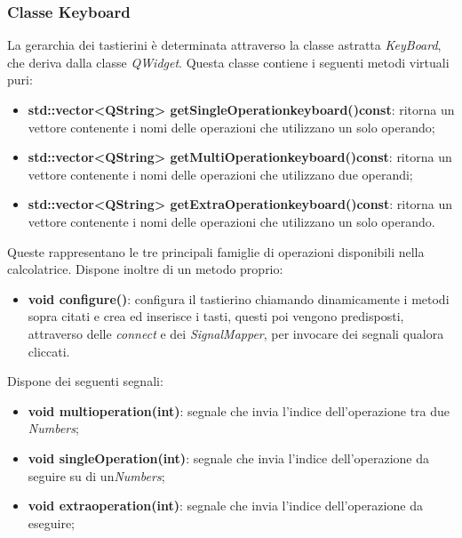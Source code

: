 \documentclass[a4paper,10pt]{article}
\begin{document}
        \subsubsection{Classe Keyboard}
        La gerarchia dei tastierini è determinata attraverso la classe astratta \textit{KeyBoard}, che deriva dalla classe \textit{QWidget}.
        Questa classe contiene i seguenti metodi virtuali puri:
        \begin{itemize}
            \item \textbf{std::vector<QString> getSingleOperationkeyboard()const}: ritorna un vettore contenente i nomi delle operazioni che utilizzano un solo operando;
            \item \textbf{std::vector<QString> getMultiOperationkeyboard()const}: ritorna un vettore contenente i nomi delle operazioni che utilizzano due operandi;
            \item \textbf{std::vector<QString> getExtraOperationkeyboard()const}: ritorna un vettore contenente i nomi delle operazioni che utilizzano un solo operando.
        \end{itemize}
        Queste rappresentano le tre principali famiglie di operazioni disponibili nella calcolatrice.
        Dispone inoltre di un metodo proprio:
            \begin{itemize}
                \item \textbf{void configure()}: configura il tastierino chiamando dinamicamente i metodi sopra citati e crea ed inserisce i tasti, questi poi vengono predisposti, attraverso delle \textit{connect} e dei \textit{SignalMapper}, per invocare dei segnali qualora cliccati.
            \end{itemize}
        Dispone dei seguenti segnali:
            \begin{itemize}
                \item \textbf{void multioperation(int)}: segnale che invia l'indice dell'operazione tra due \textit{Numbers};
                \item \textbf{void singleOperation(int)}: segnale che invia l'indice dell'operazione da seguire su di un\textit{Numbers};
                \item \textbf{void extraoperation(int)}: segnale che invia l'indice dell'operazione da eseguire;
            \end{itemize}
    
\end{document}
